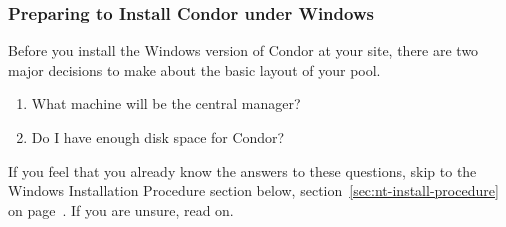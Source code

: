 \subsubsection{\label{sec:NT-Preparing-to-Install}Preparing to Install
Condor under Windows } 

Before you install the Windows version of Condor at your site,
there are two major
decisions to make about the basic layout of your pool.

\begin{enumerate}
\item What machine will be the central manager?
\item Do I have enough disk space for Condor?
\end{enumerate}

If you feel that you already know the answers to these questions,
skip to the Windows Installation Procedure section below,
section~\ref{sec:nt-install-procedure} on
page~\pageref{sec:nt-install-procedure}.
If you are unsure, read on.

